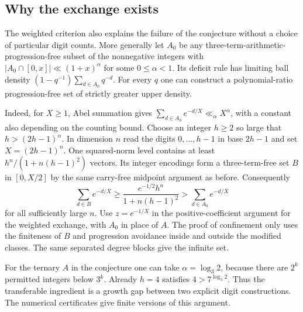 \subsection*{Why the exchange exists}
The weighted criterion also explains the failure of the conjecture without a
choice of particular digit counts. More generally let $A_0$ be any
three-term-arithmetic-progression-free subset of the nonnegative integers
with $|A_0\cap[0,x]|\ll (1+x)^\alpha$ for some $0\le\alpha<1$.
Its deficit rule has limiting ball density
$(1-q^{-1})\sum_{d\in A_0}q^{-d}$. For every $q$ one can construct a
polynomial-ratio progression-free set of strictly greater upper density.

Indeed, for $X\ge1$, Abel summation gives
$\sum_{d\in A_0}e^{-d/X}\ll_\alpha X^\alpha$, with a constant also
depending on the counting bound. Choose an integer $h\ge2$ so large that
$h>(2h-1)^\alpha$. In dimension $n$ read the digits $0,\ldots,h-1$
in base $2h-1$ and set $X=(2h-1)^n$. One squared-norm level contains at
least $h^n/(1+n(h-1)^2)$ vectors. Its integer encodings form a
three-term-free set $B$ in $[0,X/2]$ by the same carry-free midpoint
argument as before. Consequently
\[
 \sum_{d\in B}e^{-d/X}\ge
 \frac{e^{-1/2}h^n}{1+n(h-1)^2}>\sum_{d\in A_0}e^{-d/X}
\]
for all sufficiently large $n$. Use $z=e^{-1/X}$ in the positive-coefficient
argument for the weighted exchange, with $A_0$ in place of $A$. The proof
of confinement only uses the finiteness of $B$ and progression avoidance
inside and outside the modified classes. The same separated degree blocks
give the infinite set.

For the ternary $A$ in the conjecture one can take $\alpha=\log_3 2$,
because there are $2^k$ permitted integers below $3^k$. Already $h=4$
satisfies $4>7^{\log_3 2}$. Thus the transferable ingredient is a growth
gap between two explicit digit constructions. The numerical certificates
give finite versions of this argument.

